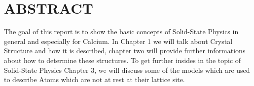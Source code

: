 \section*{ABSTRACT}

The goal of this report is to show the basic concepts of Solid-State Physics in general and especially for Calcium. In Chapter 1 we will talk about Crystal Structure and how it is described, chapter two will provide further informations about how to determine these structures.
To get further insides in the topic of Solid-State Physics Chapter 3, we will discuss some of the models which are used to describe Atoms which are not at rest at their lattice site.

